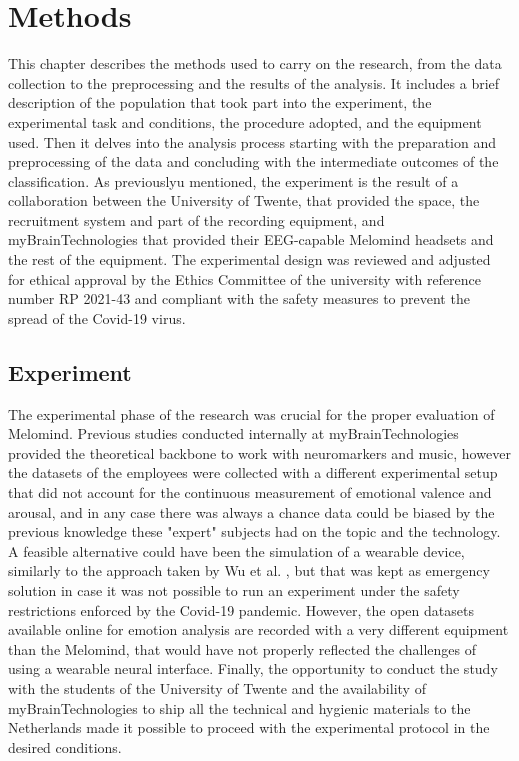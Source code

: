 \chapter{Methods}
\label{chap:methods}
This chapter describes the methods used to carry on the research, from the data collection to the preprocessing and the results of the analysis. It includes a brief description of the population that took part into the experiment, the experimental task and conditions, the procedure adopted, and the equipment used. Then it delves into the analysis process starting with the preparation and preprocessing of the data and concluding with the intermediate outcomes of the classification. As previouslyu mentioned, the experiment is the result of a collaboration between the University of Twente, that provided the space, the recruitment system and part of the recording equipment, and myBrainTechnologies that provided their EEG-capable Melomind headsets and the rest of the equipment. The experimental design was reviewed and adjusted for ethical approval by the Ethics Committee of the university with reference number RP 2021-43 and compliant with the safety measures to prevent the spread of the Covid-19 virus.

\section{Experiment}
\label{sec:experiment}
The experimental phase of the research was crucial for the proper evaluation of Melomind. Previous studies conducted internally at myBrainTechnologies provided the theoretical backbone to work with neuromarkers and music, however the datasets of the employees were collected with a different experimental setup that did not account for the continuous measurement of emotional valence and arousal, and in any case there was always a chance data could be biased by the previous knowledge these "expert" subjects had on the topic and the technology. A feasible alternative could have been the simulation of a wearable device, similarly to the approach taken by Wu et al. \cite{wu_estimation_2017}, but that was kept as emergency solution in case it was not possible to run an experiment under the safety restrictions enforced by the Covid-19 pandemic. However, the open datasets available online for emotion analysis \cite{koelstra_deap_2012,soleymani_multimodal_2012,soleymani_deam_nodate} are recorded with a very different equipment than the Melomind, that would have not properly reflected the challenges of using a wearable neural interface. Finally, the opportunity to conduct the study with the students of the University of Twente and the availability of myBrainTechnologies to ship all the technical and hygienic materials to the Netherlands made it possible to proceed with the experimental protocol in the desired conditions.

